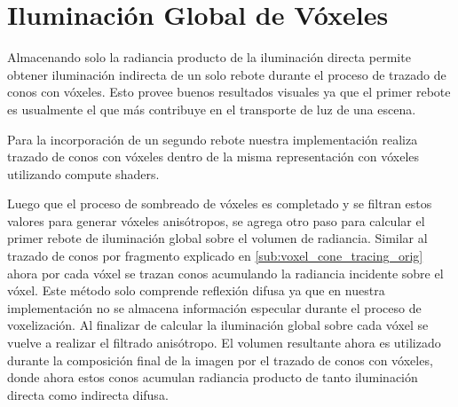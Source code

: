 \section{Iluminación Global de Vóxeles} %
\label{sec:iluminacion_global_de_voxeles}
Almacenando solo la radiancia producto de la iluminación directa permite obtener iluminación indirecta de un solo rebote durante el proceso de trazado de conos con vóxeles. Esto provee buenos resultados visuales ya que el primer rebote es usualmente el que más contribuye en el transporte de luz de una escena.

Para la incorporación de un segundo rebote nuestra implementación realiza trazado de conos con vóxeles dentro de la misma representación con vóxeles utilizando compute shaders. 

Luego que el proceso de sombreado de vóxeles es completado y se filtran estos valores para generar vóxeles anisótropos, se agrega otro paso para calcular el primer rebote de iluminación global sobre el volumen de radiancia. Similar al trazado de conos por fragmento explicado en \ref{sub:voxel_cone_tracing_orig} ahora por cada vóxel se trazan conos acumulando la radiancia incidente sobre el vóxel. Este método solo comprende reflexión difusa ya que en nuestra implementación no se almacena información especular durante el proceso de voxelización. Al finalizar de calcular la iluminación global sobre cada vóxel se vuelve a realizar el filtrado anisótropo. El volumen resultante ahora es utilizado durante la composición final de la imagen por el trazado de conos con vóxeles, donde ahora estos conos acumulan radiancia producto de tanto iluminación directa como indirecta difusa.
